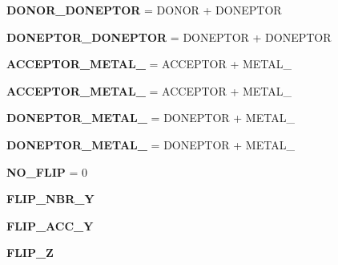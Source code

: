 \begin{CompactItemize}
\item 
\textbf{DONOR\_\-DONEPTOR} = DONOR + DONEPTOR\label{classASCbase_1_1HbondGeometry_c0cc28273dcab0f6d690a41ff295b4c7bfc921b96362e9a318e6ec9432caf620}

\item 
\textbf{DONEPTOR\_\-DONEPTOR} = DONEPTOR + DONEPTOR\label{classASCbase_1_1HbondGeometry_c0cc28273dcab0f6d690a41ff295b4c7b865650cd901b4ab0175655d807248e9}

\item 
\textbf{ACCEPTOR\_\-METAL\_} = ACCEPTOR + METAL\_\label{classASCbase_1_1HbondGeometry_c0cc28273dcab0f6d690a41ff295b4c7bca79ba395ce711d8aa3beccf90fc745}

\item 
\textbf{ACCEPTOR\_\-METAL\_} = ACCEPTOR + METAL\_\label{classASCbase_1_1HbondGeometry_c0cc28273dcab0f6d690a41ff295b4c7e04071c71c857ba2eb586f73d9a94910}

\item 
\textbf{DONEPTOR\_\-METAL\_} = DONEPTOR + METAL\_\label{classASCbase_1_1HbondGeometry_c0cc28273dcab0f6d690a41ff295b4c7b5a26234ecac6d9aab327f65aeddfc8e}

\item 
\textbf{DONEPTOR\_\-METAL\_} = DONEPTOR + METAL\_\label{classASCbase_1_1HbondGeometry_c0cc28273dcab0f6d690a41ff295b4c70379a44a9e41c1028a840746708099d6}

\item 
\textbf{NO\_\-FLIP} = 0\label{classASCbase_1_1HbondGeometry_3050e159423a19503016965054e429e745e9128eb1c77dce6e3d7ec7dff9f60e}

\item 
\textbf{FLIP\_\-NBR\_\-Y}\label{classASCbase_1_1HbondGeometry_3050e159423a19503016965054e429e7c249ca22e8f59126719ec419d5480d2a}

\item 
\textbf{FLIP\_\-ACC\_\-Y}\label{classASCbase_1_1HbondGeometry_3050e159423a19503016965054e429e713b124e29dcd7cd9ddc701831191d17e}

\item 
\textbf{FLIP\_\-Z}\label{classASCbase_1_1HbondGeometry_3050e159423a19503016965054e429e7f2590814bca79e5321a0ad03611d35bc}


\end{CompactItemize}

